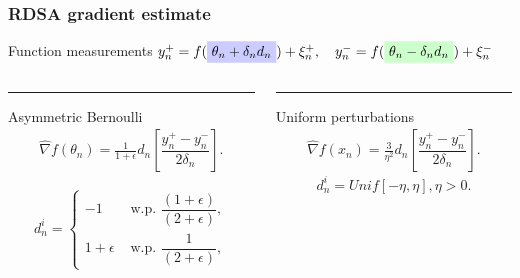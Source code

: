 \begin{frame}
\begin{small}
\frametitle{\centering  RDSA gradient estimate}

\begin{block}{Function measurements}
$y_{n}^+ = f(\tikz[baseline]{\node[fill=blue!20,anchor=base] (tL) {$\theta_n+\delta_n d_n$};} ) + \xi_{n}^+,\quad y_{n}^- = f(\tikz[baseline]{\node[fill=green!20,anchor=base] (tL1) {$\theta_n-\delta_n d_n$};}) + \xi_{n}^-$
\end{block}
\pause
\begin{block}{}
\begin{columns}[T]
\begin{column}{.48\textwidth}
\color{red}\rule{\linewidth}{4pt}
Asymmetric Bernoulli
\begin{align}
\label{eq:grad-unif}
\widehat\nabla f(\theta_n) = \frac{1}{1+\epsilon} d_n \left[ \dfrac{y_n^+ - y_n^-}{2\delta_n}\right].
\end{align}

\begin{equation}
\label{eq:det-proj}
 d_n^i =
  \begin{cases}
   -1 &  \text{ w.p. } \dfrac{(1+\epsilon)}{(2+\epsilon)}, \\
   1+\epsilon &  \text{ w.p. } \dfrac{1}{(2+\epsilon)},
  \end{cases}
\end{equation}
\end{column}
\pause
\begin{column}{.48\textwidth}
\color{blue}\rule{\linewidth}{4pt}
Uniform perturbations
\begin{align}
\label{eq:grad-unif}
\widehat\nabla f(x_n) = \frac3{\eta^2} d_n \left[ \dfrac{y_n^+ - y_n^-}{2\delta_n}\right].
\end{align}
\begin{equation}
\label{eq:det-proj-unif}
 d_n^i = Unif[-\eta,\eta], \eta>0.
 \end{equation}
\end{column}
\end{columns}
\end{block}
\end{small}
\end{frame}


